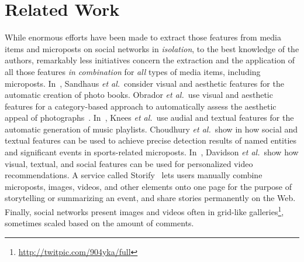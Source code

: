 \documentclass{article}
\let\oldsection\section
\renewcommand{\section}[1]{\oldsection{#1}\vspace{-0.95em}}
\begin{document}

\vspace{-0.95em}
\section{Related Work}
While enormous efforts have been made to extract those features
from media items and microposts on social networks in \emph{isolation},
to the best knowledge of the authors, remarkably less initiatives 
concern the extraction and the application
of all those features \emph{in combination}
for \emph{all} types of media items, including microposts.
In~\cite{Photo2011}, Sandhaus \emph{et al.}\ consider visual and
aesthetic features for the automatic creation of photo books.
Obrador \emph{et al.}\ use visual and aesthetic features
for a category-based approach to automatically assess
the aesthetic appeal of photographs~\cite{Photo2012}.
In~\cite{Playlist2006}, Knees \emph{et al.}\ use audial and textual
features for the automatic generation of music playlists.
Choudhury \emph{et al.}\ show in \cite{Sports2011} how social and textual
features can be used to achieve precise detection results 
of named entities and significant events in sports-related microposts.
In~\cite{YouTube2010}, Davidson \emph{et al.}\ show how visual,
textual, and social features can be used for personalized video recommendations.
A service called Storify~\cite{Storify2011} lets users manually combine
microposts, images, videos, and other elements onto one page for the purpose
of storytelling or summarizing an event,
and share stories permanently on the Web.
Finally, social networks present images and videos
often in grid-like galleries\footnote{\url{http://twitpic.com/904yka/full}}, sometimes scaled
based on the amount of comments.
\end{document}
